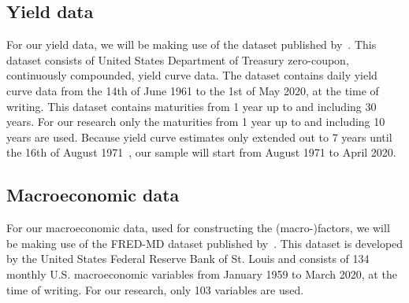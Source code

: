 \subsection{Yield data}
For our yield data, we will be making use of the dataset published by~\textcite{Grkaynak2007}. This dataset consists of United States Department of Treasury zero-coupon, continuously compounded, yield curve data. The dataset contains daily yield curve data from the 14th of June 1961 to the 1st of May 2020, at the time of writing. This dataset contains maturities from 1 year up to and including 30 years. For our research only the maturities from 1 year up to and including 10 years are used. Because yield curve estimates only extended out to 7 years until the 16th of August 1971~\parencite[see][p.~19]{Grkaynak2007}, our sample will start from August 1971 to April 2020. 

\subsection{Macroeconomic data}
For our macroeconomic data, used for constructing the (macro-)factors, we will be making use of the FRED-MD dataset published by~\textcite{McCracken2016}. This dataset is developed by the United States Federal Reserve Bank of St. Louis and consists of 134 monthly U.S. macroeconomic variables from January 1959 to March 2020, at the time of writing. For our research, only 103 variables are used.